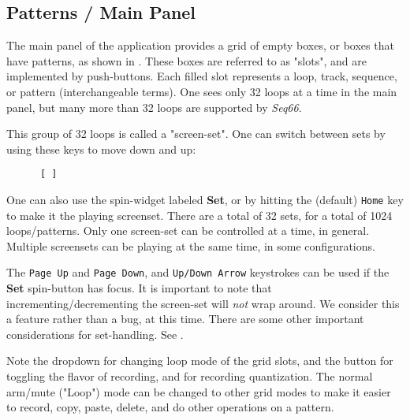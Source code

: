 
\subsection{Patterns / Main Panel}
\label{subsec:patterns_panel_main}

   The main panel of the application provides a grid of empty boxes,
   or boxes that have patterns,
   as shown in
   .
   These boxes are referred to as "slots", and are implemented by
   push-buttons.
   Each filled slot represents a loop, track, sequence, or pattern
   (interchangeable terms).
   One sees only 32 loops at a time in the main panel, but many more than
   32 loops are supported by \textsl{Seq66}.

   This group of 32 loops is called a "screen-set".
   One can switch between sets by using these keys to move down and up:
   \index{keys![}
   \index{keys!]}

   \begin{verbatim}
      [ ]
   \end{verbatim}

   One can also use 
   the spin-widget labeled \textbf{Set}, or
   by hitting the (default) \texttt{Home} key to make it the playing screenset.
   There are a total of 32 sets, for a total of 1024 loops/patterns. 
   Only one screen-set can be controlled at a time, in general.
   Multiple screensets can be playing at the same time, in some configurations.

   The \texttt{Page Up} and \texttt{Page Down}, and \texttt{Up/Down Arrow}
   keystrokes can be used if the \textbf{Set} spin-button has focus.
   It is important to note that incrementing/decrementing
   the screen-set will \textsl{not} wrap around.
   We consider this a feature rather than a bug, at this time.
   There are some other important considerations for set-handling.
   See .

   Note the dropdown for changing
   loop mode of the grid slots, and the button for toggling
   the flavor of recording, and for recording quantization.
   The normal arm/mute ("Loop") mode can be changed to other grid
   modes to make it easier to record, copy, paste, delete, and do other
   operations on a pattern.

